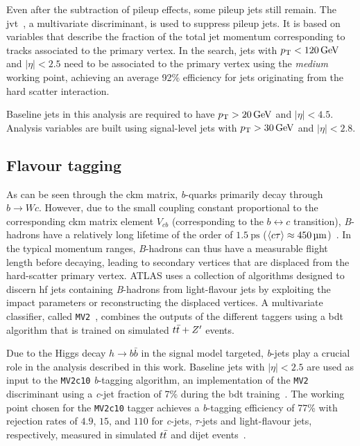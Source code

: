Even after the subtraction of pileup effects, some pileup jets still remain. The \gls{jvt}~\cite{PERF-2014-03}, a multivariate discriminant, is used to suppress pileup jets.
It is based on variables that describe the fraction of the total jet momentum corresponding to tracks associated to the primary vertex.
In the \onelepton search, jets with $\pt < \SI{120}{\GeV}$ and $\vert\eta\vert < 2.5$ need to be associated to the primary vertex using the \textit{medium}~\cite{Aad:2020flx} working point, achieving an average 92\% efficiency for jets originating from the hard scatter interaction.

Baseline jets in this analysis are required to have $\pt > \SI{20}{\GeV}$ and $\vert\eta\vert < 4.5$. Analysis variables are built using signal-level jets with $\pt > \SI{30}{\GeV}$ and $\vert\eta\vert < 2.8$.

\subsection{Flavour tagging}\label{sec:flavour_tagging}

As can be seen through the \gls{ckm} matrix, \textit{b}-quarks primarily decay through $b\rightarrow W c$.
However, due to the small coupling constant proportional to the corresponding \gls{ckm} matrix element $V_{cb}$ (corresponding to the $b \leftrightarrow c $ transition), \textit{B}-hadrons have a relatively long lifetime of the order of $\SI{1.5}{\pico\second}$ ($\braket{c\tau} \approx \SI{450}{\micro\meter}$)~\cite{pdg2020}.
In the typical momentum ranges, \textit{B}-hadrons can thus have a measurable flight length before decaying, leading to secondary vertices that are displaced from the hard-scatter primary vertex.
ATLAS uses a collection of algorithms designed to discern \gls{hf} jets containing \textit{B}-hadrons from light-flavour jets by exploiting the impact parameters or reconstructing the displaced vertices.
A multivariate classifier, called \texttt{MV2}~\cite{ATL-PHYS-PUB-2017-013}, combines the outputs of the different taggers using a \gls{bdt} algorithm that is trained on simulated $t\bar{t} + Z'$ events. 

Due to the Higgs decay $h\rightarrow b\bar{b}$ in the signal model targeted, \textit{b}-jets play a crucial role in the analysis described in this work.
Baseline jets with $\vert\eta\vert < 2.5$ are used as input to the \texttt{MV2c10} \textit{b}-tagging algorithm, an implementation of the \texttt{MV2} discriminant using a \textit{c}-jet fraction of 7\% during the \gls{bdt} training~\cite{FTAG-2018-01, PERF-2016-05}.
The working point chosen for the \texttt{MV2c10} tagger achieves a \textit{b}-tagging efficiency of 77\% with rejection rates of $4.9$, $15$, and $110$ for \textit{c}-jets, $\tau$-jets and light-flavour jets, respectively, measured in simulated $t\bar{t}$ and dijet events~\cite{FTAG-2018-01}.

